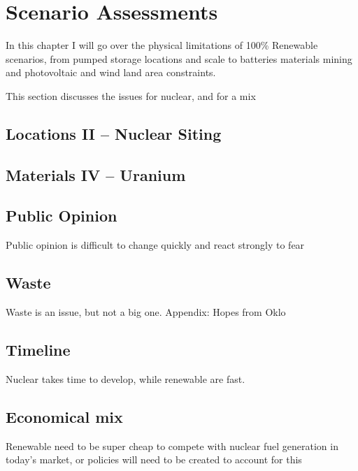 \setchapterpreamble[u]{\margintoc}
\chapter{Scenario Assessments}

In this chapter I will go over the physical limitations of 100\% Renewable scenarios, from pumped storage locations and scale to batteries materials mining and photovoltaic and wind land area constraints.

This section discusses the issues for nuclear, and for a mix

\section{Locations II -- Nuclear Siting}

\blindtext

\section{Materials IV -- Uranium}

\blindtext

\section{Public Opinion}

Public opinion is difficult to change quickly and react strongly to fear

\blindtext

\section{Waste}

Waste is an issue, but not a big one. Appendix: Hopes from Oklo

\blindtext

\section{Timeline}

Nuclear takes time to develop, while renewable are fast.

\blindtext

\section{Economical mix}

Renewable need to be super cheap to compete with nuclear fuel generation in today's market, or policies will need to be created to account for this

